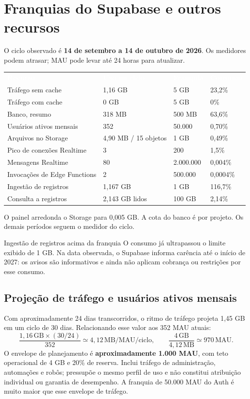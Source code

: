 \documentclass[10pt,a4paper]{article}
\newcommand{\smallnote}[1]{\par{\footnotesize\color{NFMuted}#1\par}}
\newcommand{\headcell}[1]{\textcolor{white}{\bfseries #1}}
\newcommand{\pagechapter}[1]{\clearpage\section{#1}}
\begin{document}
\pagechapter{Franquias do Supabase e outros recursos}
O ciclo observado é \textbf{14 de setembro a 14 de outubro de 2026}. Os medidores podem atrasar; MAU pode levar até 24 horas para atualizar.

\begingroup\small\renewcommand{\arraystretch}{1.25}
\par\noindent\begin{tabularx}{\linewidth}{@{}Y R{34mm}R{32mm}R{21mm}@{}}
\headcell{Recurso}&\headcell{Uso no ciclo}&\headcell{Franquia}&\headcell{Consumo}\\
Tráfego sem cache&1,16 GB&5 GB&23,2\%\\
Tráfego com cache&0 GB&5 GB&0\%\\
Banco, resumo&318 MB&500 MB&63,6\%\\
Usuários ativos mensais&352&50.000&0,70\%\\
Arquivos no Storage&4,90 MB / 15 objetos&1 GB&0,49\%\\
Pico de conexões Realtime&3&200&1,5\%\\
Mensagens Realtime&80&2.000.000&0,004\%\\
Invocações de Edge Functions&2&500.000&0,0004\%\\
Ingestão de registros&1,167 GB&1 GB&\textcolor{NFDanger}{116,7\%}\\
Consulta a registros&2,143 GB lidos&100 GB&2,14\%\\
\end{tabularx}\endgroup
\smallnote{O painel arredonda o Storage para 0,005 GB. A cota do banco é por projeto. Os demais períodos seguem o medidor do ciclo.}

\begin{NFBox}{Ingestão de registros acima da franquia}
O consumo já ultrapassou o limite exibido de 1 GB. Na data observada, o Supabase informa carência até o início de 2027: os avisos são informativos e ainda não aplicam cobrança ou restrições por esse consumo.
\end{NFBox}

\subsection{Projeção de tráfego e usuários ativos mensais}
Com aproximadamente 24 dias transcorridos, o ritmo de tráfego projeta 1,45 GB em um ciclo de 30 dias. Relacionando esse valor aos 352 MAU atuais:
\[
\frac{1{,}16\,\mathrm{GB}\times(30/24)}{352}
\simeq 4{,}12\,\mathrm{MB/MAU/ciclo},
\qquad
\frac{4\,\mathrm{GB}}{4{,}12\,\mathrm{MB}}\simeq 970\,\mathrm{MAU}.
\]
O envelope de planejamento é \textbf{aproximadamente 1.000 MAU}, com teto operacional de 4 GB e 20\% de reserva. Inclui tráfego de administração, automações e robôs; pressupõe o mesmo perfil de uso e não constitui atribuição individual ou garantia de desempenho. A franquia de 50.000 MAU do Auth é muito maior que esse envelope de tráfego.
\end{document}
